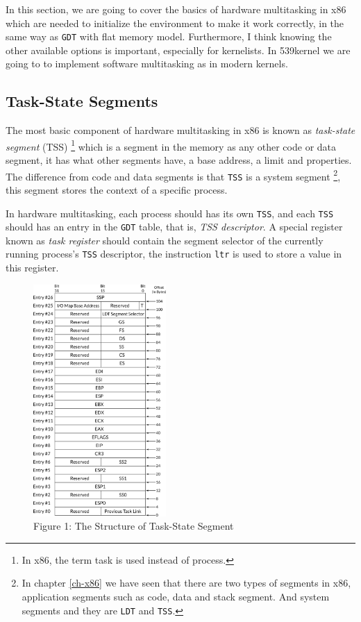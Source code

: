 In this section, we are going to cover the basics of hardware
multitasking in x86 which are needed to initialize the environment to
make it work correctly, in the same way as \lstinline!GDT! with flat
memory model. Furthermore, I think knowing the other available options
is important, especially for kernelists. In 539kernel we are going to to
implement software multitasking as in modern kernels.

\subsection{Task-State Segments}\label{task-state-segments}

The most basic component of hardware multitasking in x86 is known as
\emph{task-state segment} (TSS) \footnote{In x86, the term task is used
  instead of process.} which is a segment in the memory as any other
code or data segment, it has what other segments have, a base address, a
limit and properties. The difference from code and data segments is that
\lstinline!TSS! is a system segment \footnote{In chapter \ref{ch-x86} we
  have seen that there are two types of segments in x86, application
  segments such as code, data and stack segment. And system segments and
  they are \lstinline!LDT! and \lstinline!TSS!.}, this segment stores
the context of a specific process.

In hardware multitasking, each process should has its own
\lstinline!TSS!, and each \lstinline!TSS! should has an entry in the
\lstinline!GDT! table, that is, \emph{TSS descriptor}. A special
register known as \emph{task register} should contain the segment
selector of the currently running process's \lstinline!TSS! descriptor,
the instruction \lstinline!ltr! is used to store a value in this
register.

\hypertarget{fig:tss}{
\begin{figure}
\centering
\includegraphics[width=0.45000\textwidth]{Figures/process-ch/tss.png}
\caption{Figure 1: The Structure of Task-State Segment}\label{fig:tss}
\end{figure}
}

